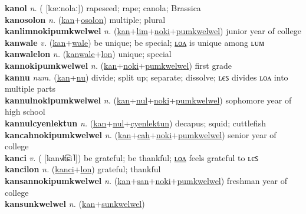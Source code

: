 \textbf{kanol} \textit{n.} ( [kæːnolaː])
rapeseed; rape; canola; Brassica \label{kanol} \\
\textbf{kanosolon} \textit{n.} (\hyperref[kan]{kan}+\hyperref[osolon]{osolon})
multiple; plural \label{kanosolon} \\
\textbf{kanlimnokipumkwelwel} \textit{n.} (\hyperref[kan]{kan}+\hyperref[lim]{lim}+\hyperref[noki]{noki}+\hyperref[pumkwelwel]{pumkwelwel})
junior year of college \label{kanlimnokipumkwelwel} \\
\textbf{kanwale} \textit{v.} (\hyperref[kan]{kan}+\hyperref[wale]{wale})
be unique; be special; \hyperref[kanwalelon]{ʟᴏᴧ} is unique among ʟᴜᴍ \label{kanwale} \\
\textbf{kanwalelon} \textit{n.} (\hyperref[kanwale]{kanwale}+\hyperref[lon]{lon})
unique; special \label{kanwalelon} \\
\textbf{kannokipumkwelwel} \textit{n.} (\hyperref[kan]{kan}+\hyperref[noki]{noki}+\hyperref[pumkwelwel]{pumkwelwel})
first grade \label{kannokipumkwelwel} \\
\textbf{kannu} \textit{num.} (\hyperref[kan]{kan}+\hyperref[nu]{nu})
divide; split up; separate; dissolve; ʟєꜱ divides ʟᴏᴧ into multiple parts \label{kannu} \\
\textbf{kannulnokipumkwelwel} \textit{n.} (\hyperref[kan]{kan}+\hyperref[nul]{nul}+\hyperref[noki]{noki}+\hyperref[pumkwelwel]{pumkwelwel})
sophomore year of high school \label{kannulnokipumkwelwel} \\
\textbf{kannulcyenlektun} \textit{n.} (\hyperref[kan]{kan}+\hyperref[nul]{nul}+\hyperref[cyenlektun]{cyenlektun})
decapus; squid; cuttlefish \label{kannulcyenlektun} \\
\textbf{kancahnokipumkwelwel} \textit{n.} (\hyperref[kan]{kan}+\hyperref[cah]{cah}+\hyperref[noki]{noki}+\hyperref[pumkwelwel]{pumkwelwel})
senior year of college \label{kancahnokipumkwelwel} \\
\textbf{kanci} \textit{v.} ( [kan˧˩˧t͡ɕi˥])
be grateful; be thankful; \hyperref[kancilon]{ʟᴏᴧ} feels grateful to ʟєꜱ \label{kanci} \\
\textbf{kancilon} \textit{n.} (\hyperref[kanci]{kanci}+\hyperref[lon]{lon})
grateful; thankful \label{kancilon} \\
\textbf{kansannokipumkwelwel} \textit{n.} (\hyperref[kan]{kan}+\hyperref[san]{san}+\hyperref[noki]{noki}+\hyperref[pumkwelwel]{pumkwelwel})
freshman year of college \label{kansannokipumkwelwel} \\
\textbf{kansunkwelwel} \textit{n.} (\hyperref[kan]{kan}+\hyperref[sunkwelwel]{sunkwelwel})
